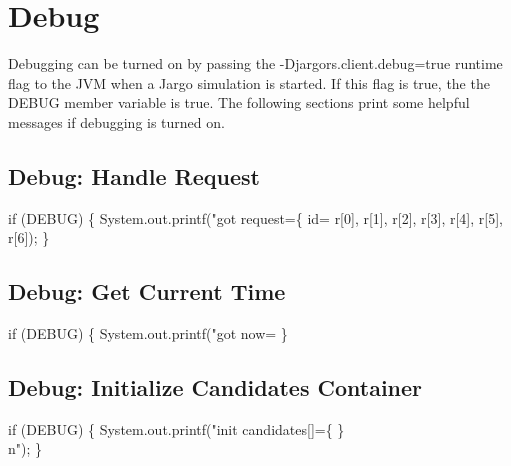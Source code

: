 \section{Debug}

Debugging can be turned on by passing the {\Tt{}-Djargors.client.debug=true\nwendquote}
runtime flag to the JVM when a Jargo simulation is started. If this flag is
true, the the {\Tt{}DEBUG\nwendquote} member variable is true. The following sections print
some helpful messages if debugging is turned on.

\subsection{Debug: Handle Request}

\nwenddocs{}\endmoddef\nwstartdeflinemarkup{}\nwenddeflinemarkup
if (DEBUG) \{
  System.out.printf("got request=\{ id=%
      r[0], r[1], r[2], r[3], r[4], r[5], r[6]);
\}
\nwendcode{}\nwdocspar

\subsection{Debug: Get Current Time}

\nwenddocs{}\endmoddef\nwstartdeflinemarkup{}\nwenddeflinemarkup
if (DEBUG) \{
  System.out.printf("got now=%
\}
\nwendcode{}\nwdocspar

\subsection{Debug: Initialize Candidates Container}

\nwenddocs{}\endmoddef\nwstartdeflinemarkup{}\nwenddeflinemarkup
if (DEBUG) \{
  System.out.printf("init candidates[]=\{ \}\\n");
\}
\nwendcode{}\nwdocspar

